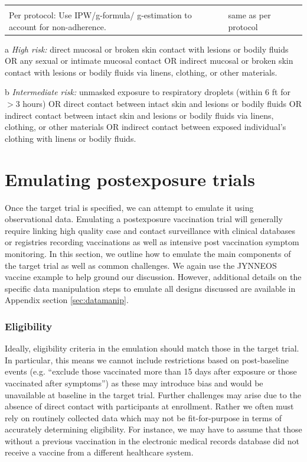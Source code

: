 \documentclass[11pt]{article}
\begin{document}
\begin{table}[p]
\begin{threeparttable}
\begin{tabular}{>{\raggedright\arraybackslash}p{2.5cm}>{\raggedright\arraybackslash}p{7.75cm}>{\raggedright\arraybackslash}p{5cm}}
{        \\ Per protocol: Use IPW/g-formula/ g-estimation to account for non-adherence.} &  same as per protocol  \\
        \bottomrule
    \end{tabular}
    \begin{tablenotes}
        \item[a] \textit{High risk:} direct mucosal or broken skin contact with lesions or bodily fluids OR any sexual or intimate mucosal contact OR indirect mucosal or broken skin contact with lesions or bodily fluids via linens, clothing, or other materials.
        \item[b] \textit{Intermediate risk:} unmasked exposure to respiratory droplets (within 6 ft for $>$3 hours) OR direct contact between intact skin and lesions or bodily fluids OR indirect contact between intact skin and lesions or bodily fluids via linens, clothing, or other materials OR indirect contact between exposed individual's clothing with linens or bodily fluids.
    \end{tablenotes}
\end{threeparttable}
\end{table}

\section{Emulating postexposure trials}
Once the target trial is specified, we can attempt to emulate it using observational data. Emulating a postexposure vaccination trial will generally require linking high quality case and contact surveillance with clinical databases or registries recording vaccinations as well as intensive post vaccination symptom monitoring. In this section, we outline how to emulate the main components of the target trial as well as common challenges. We again use the JYNNEOS vaccine example to help ground our discussion. However, additional details on the specific data manipulation steps to emulate all designs discussed are available in Appendix section \ref{sec:datamanip}.

\subsubsection*{Eligibility}
Ideally, eligibility criteria in the emulation should match those in the target trial. In particular, this means we cannot include restrictions based on post-baseline events (e.g. ``exclude those vaccinated more than 15 days after exposure or those vaccinated after symptoms'') as these may introduce bias and would be unavailable at baseline in the target trial. Further challenges may arise due to the absence of direct contact with participants at enrollment. Rather we often must rely on routinely collected data which may not be fit-for-purpose in terms of accurately determining eligibility. For instance, we may have to assume that those without a previous vaccination in the electronic medical records database did not receive a vaccine from a different healthcare system.
\end{document}
